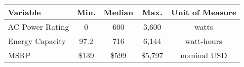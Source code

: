 \begin{tabular}{lcccc}
\hline
Variable &Min.&Median&Max. & Unit of Measure \\ \hline
AC Power Rating & 0 & 600 & 3,600 & watts \\
Energy Capacity &97.2 & 716 & 6,144 & watt-hours \\
MSRP & \$139 & \$599 & \$5,797 & nominal USD \\
\hline
\end{tabular}